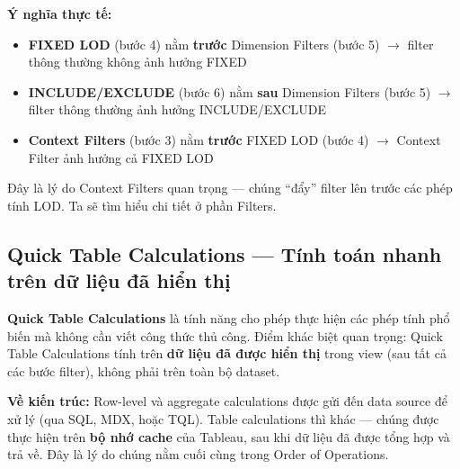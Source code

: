 \documentclass[12pt]{article}
\begin{document}
\noindent \textbf{Ý nghĩa thực tế:}
\begin{itemize}[nosep]
    \item \textbf{FIXED LOD} (bước 4) nằm \textbf{trước} Dimension Filters (bước 5) $\rightarrow$ filter thông thường không ảnh hưởng FIXED
    \item \textbf{INCLUDE/EXCLUDE} (bước 6) nằm \textbf{sau} Dimension Filters (bước 5) $\rightarrow$ filter thông thường ảnh hưởng INCLUDE/EXCLUDE
    \item \textbf{Context Filters} (bước 3) nằm \textbf{trước} FIXED LOD (bước 4) $\rightarrow$ Context Filter ảnh hưởng cả FIXED LOD
\end{itemize}

\noindent Đây là lý do Context Filters quan trọng --- chúng ``đẩy'' filter lên trước các phép tính LOD. Ta sẽ tìm hiểu chi tiết ở phần Filters.

\subsection{Quick Table Calculations --- Tính toán nhanh trên dữ liệu đã hiển thị}

\noindent \textbf{Quick Table Calculations} là tính năng cho phép thực hiện các phép tính phổ biến mà không cần viết công thức thủ công. Điểm khác biệt quan trọng: Quick Table Calculations tính trên \textbf{dữ liệu đã được hiển thị} trong view (sau tất cả các bước filter), không phải trên toàn bộ dataset.

\noindent \textbf{Về kiến trúc:} Row-level và aggregate calculations được gửi đến data source để xử lý (qua SQL, MDX, hoặc TQL). Table calculations thì khác --- chúng được thực hiện trên \textbf{bộ nhớ cache} của Tableau, sau khi dữ liệu đã được tổng hợp và trả về. Đây là lý do chúng nằm cuối cùng trong Order of Operations.
\end{document}

